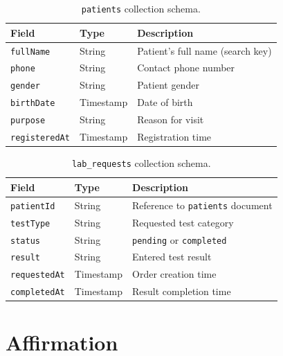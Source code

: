 \documentclass[12pt,a4paper,oneside]{report}
\newcommand{\source}[1]{\par\vspace{2pt}{\small\itshape Source: #1}\par}
\begin{document}
\begin{table}[htbp]
  \centering
  \caption{\texttt{patients} collection schema.}
  \label{tab:patients}
  \begin{tabularx}{\textwidth}{l l X}
    \toprule
    \textbf{Field} & \textbf{Type} & \textbf{Description}\\
    \midrule
    \texttt{fullName} & String & Patient's full name (search key)\\
    \texttt{phone} & String & Contact phone number\\
    \texttt{gender} & String & Patient gender\\
    \texttt{birthDate} & Timestamp & Date of birth\\
    \texttt{purpose} & String & Reason for visit\\
    \texttt{registeredAt} & Timestamp & Registration time\\
    \bottomrule
  \end{tabularx}
  \source{author.}
\end{table}

\begin{table}[htbp]
  \centering
  \caption{\texttt{lab\_requests} collection schema.}
  \label{tab:labrequests}
  \begin{tabularx}{\textwidth}{l l X}
    \toprule
    \textbf{Field} & \textbf{Type} & \textbf{Description}\\
    \midrule
    \texttt{patientId} & String & Reference to \texttt{patients} document\\
    \texttt{testType} & String & Requested test category\\
    \texttt{status} & String & \texttt{pending} or \texttt{completed}\\
    \texttt{result} & String & Entered test result\\
    \texttt{requestedAt} & Timestamp & Order creation time\\
    \texttt{completedAt} & Timestamp & Result completion time\\
    \bottomrule
  \end{tabularx}
  \source{author.}
\end{table}

\chapter*{Affirmation}
\end{document}
